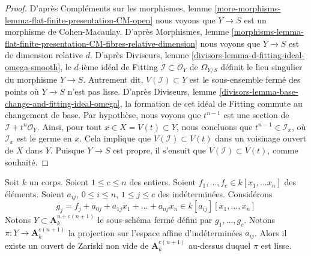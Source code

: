 \begin{proof}
D'après Compléments sur les morphismes, lemme
\ref{more-morphisms-lemma-flat-finite-presentation-CM-open}
nous voyons que $Y \to S$ est un morphisme de Cohen-Macaulay.
D'après Morphismes, lemme
\ref{morphisms-lemma-flat-finite-presentation-CM-fibres-relative-dimension}
nous voyons que $Y \to S$ est de dimension relative $d$.
D'après Diviseurs, lemme \ref{divisors-lemma-d-fitting-ideal-omega-smooth},
le $d$-ième idéal de Fitting $\mathcal{I} \subset \mathcal{O}_Y$
de $\Omega_{Y/S}$ définit le lieu singulier du morphisme $Y \to S$.
Autrement dit, $V(\mathcal{I}) \subset Y$ est le sous-ensemble fermé
des points où $Y \to S$ n'est pas lisse.
D'après Diviseurs, lemme \ref{divisors-lemma-base-change-and-fitting-ideal-omega},
la formation de cet idéal de Fitting commute au changement de base.
Par hypothèse, nous voyons que $t^{n - 1}$ est une section de
$\mathcal{I} + t^n\mathcal{O}_Y$. Ainsi, pour tout
$x \in X = V(t) \subset Y$, nous concluons que
$t^{n - 1} \in \mathcal{I}_x$, où $\mathcal{I}_x$ est le germe en $x$.
Cela implique que $V(\mathcal{I}) \subset V(t)$ dans un
voisinage ouvert de $X$ dans $Y$. Puisque $Y \to S$
est propre, il s'ensuit que $V(\mathcal{I}) \subset V(t)$,
comme souhaité.
\end{proof}

\begin{lemma}
\label{lemma-jouanolou-type-thing}
Soit $k$ un corps. Soient $1 \leq c \leq n$ des entiers.
Soient $f_1, \ldots, f_c \in k[x_1, \ldots x_n]$ des éléments.
Soient $a_{ij}$, $0 \leq i \leq n$, $1 \leq j \leq c$ des
indéterminées. Considérons
$$
g_j = f_j + a_{0j} + a_{1j}x_1 + \ldots + a_{nj}x_n \in
k[a_{ij}][x_1, \ldots, x_n]
$$
Notons $Y \subset \mathbf{A}^{n + c(n + 1)}_k$
le sous-schéma fermé défini par $g_1, \ldots, g_c$.
Notons $\pi : Y \to \mathbf{A}^{c(n + 1)}_k$ la projection
sur l'espace affine d'indéterminées $a_{ij}$.
Alors il existe un ouvert de Zariski non vide
de $\mathbf{A}^{c(n + 1)}_k$ au-dessus duquel $\pi$ est lisse.
\end{lemma}

